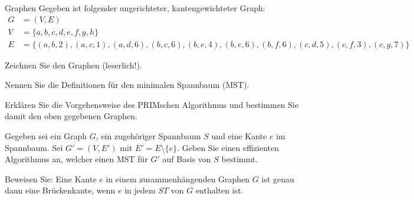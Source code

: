 \documentclass{exercisesheet}
\begin{document}
\begin{eexercises}{Graphen}{
    Gegeben ist folgender ungerichteter, kantengewichteter Graph:
    \begin{align*}
      G & = (V, E)                                                                                                           \\
      V & = \{a, b, c, d, e, f, g, h\}                                                                                       \\
      E & = \{(a, b, 2), (a, c, 1), (a, d, 6), (b, c, 6), (b, e, 4), (b, e, 6), (b, f, 6), (c, d, 5), (c, f, 3), (c, g, 7)\}
    \end{align*}
  }
  \item Zeichnen Sie den Graphen (leserlich!).
  \item Nennen Sie die Definitionen für den minimalen Spannbaum (MST).
  \item Erklären Sie die Vorgehensweise des PRIMschen Algorithmus und bestimmen Sie damit den oben gegebenen Graphen.
  \item Gegeben sei ein Graph $G$, ein zugehöriger Spannbaum $S$ und eine Kante $e$ im Spannbaum. Sei $G' = (V, E')$ mit $E' = E \setminus \{e\}$. Geben Sie einen effizienten Algorithmus an, welcher einen MST für $G'$ auf Basis von $S$ bestimmt.
  \item Beweisen Sie: Eine Kante $e$ in einem zusammenhängenden Graphen $G$ ist genau dann eine Brückenkante, wenn $e$ in jedem $ST$ von $G$ enthalten ist.
\end{eexercises}
\end{document}
